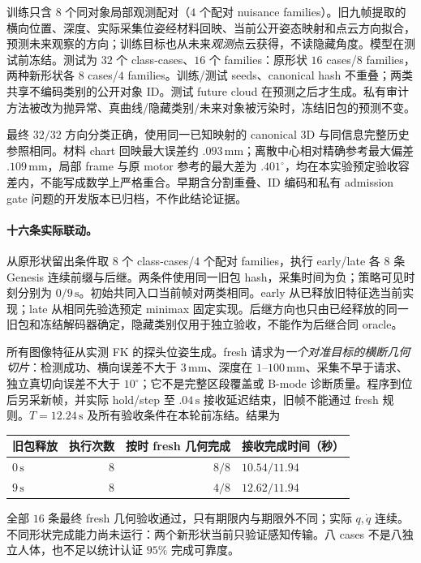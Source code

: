 \documentclass[11pt,a4paper,fontset=fandol]{ctexart}
\theoremstyle{definition}
\theoremstyle{remark}\newtheorem{remark}[theorem]{说明}
\numberwithin{equation}{section}
\begin{document}
训练只含 $8$ 个同对象局部观测配对（$4$ 个配对 nuisance families）。旧九帧提取的横向位置、深度、实际采集位姿经材料回映、当前公开姿态映射和点云方向拟合，预测未来观察的方向；训练目标也从未来\emph{观测}点云获得，不读隐藏角度。模型在测试前冻结。测试为 $32$ 个 class-cases、$16$ 个 families：原形状 $16$ cases/$8$ families，两种新形状各 $8$ cases/$4$ families。训练/测试 seeds、canonical hash 不重叠；两类共享不编码类别的公开对象 ID。测试 future cloud 在预测之后才生成。私有审计方法被改为抛异常、真曲线/隐藏类别/未来对象被污染时，冻结旧包的预测不变。

最终 $32/32$ 方向分类正确，使用同一已知映射的 canonical 3D 与同信息完整历史参照相同。材料 chart 回映最大误差约 $.093\,\mathrm{mm}$；离散中心相对精确参考最大偏差 $.109\,\mathrm{mm}$，局部 frame 与原 motor 参考的最大差为 $.401^\circ$，均在本实验预定验收容差内，不能写成数学上严格重合。早期含分割重叠、ID 编码和私有 admission gate 问题的开发版本已归档，不作此结论证据。

\paragraph{十六条实际联动。}
从原形状留出条件取 $8$ 个 class-cases/$4$ 个配对 families，执行 early/late 各 $8$ 条 Genesis 连续前缀与后继。两条件使用同一旧包 hash，采集时间为负；策略可见时刻分别为 $0/9\,\mathrm{s}$。初始共同入口当前帧对两类相同。early 从已释放旧特征选当前实现；late 从相同先验选预定 minimax 固定实现。后继方向也只由已经释放的同一旧包和冻结解码器确定，隐藏类别仅用于独立验收，不能作为后继合同 oracle。

所有图像特征从实测 FK 的探头位姿生成。fresh 请求为\emph{一个对准目标的横断几何切片}：检测成功、横向误差不大于 $3\,\mathrm{mm}$、深度在 $1$--$100\,\mathrm{mm}$、采集不早于请求、独立真切向误差不大于 $10^\circ$；它不是完整区段覆盖或 B-mode 诊断质量。程序到位后另采新帧，并实际 hold/step 至 $.04\,\mathrm{s}$ 接收延迟结束，旧帧不能通过 fresh 规则。$T=12.24\,\mathrm{s}$ 及所有验收条件在本轮前冻结。结果为
\begin{center}
\begin{tabular}{lrrl}
\toprule 旧包释放 & 执行次数 & 按时 fresh 几何完成 & 接收完成时间（秒）\\\midrule
$0\,\mathrm{s}$ & $8$ & $8/8$ & $10.54/11.94$\\
$9\,\mathrm{s}$ & $8$ & $4/8$ & $12.62/11.94$\\\bottomrule
\end{tabular}
\end{center}
全部 $16$ 条最终 fresh 几何验收通过，只有期限内与期限外不同；实际 $q,\dot q$ 连续。不同形状完成能力尚未运行：两个新形状当前只验证感知传输。八 cases 不是八独立人体，也不足以统计认证 $95\%$ 完成可靠度。
\end{document}
